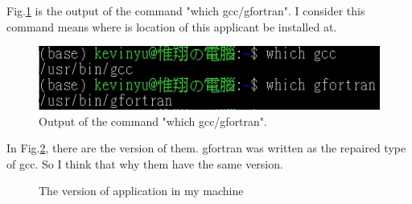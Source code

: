 \documentclass{article}
\begin{document}
Fig.\ref{which} is the output of the command "which gcc/gfortran".
I consider this command means where is location of this applicant be installed at.
\begin{figure}[h]
    \centering 
	\includegraphics[scale=0.65]{which.jpg}
	\caption{Output of the command "which gcc/gfortran".} %
	\label{which} %
\end{figure}

In Fig.\ref{gversion}, there are the version of them. gfortran was written as the repaired type of gcc. So I think that why them have the same version. \\
\begin{figure}[h]
    \centering
    \caption{The version of application in my machine}
    \label{gversion}
\end{figure}
\end{document}
